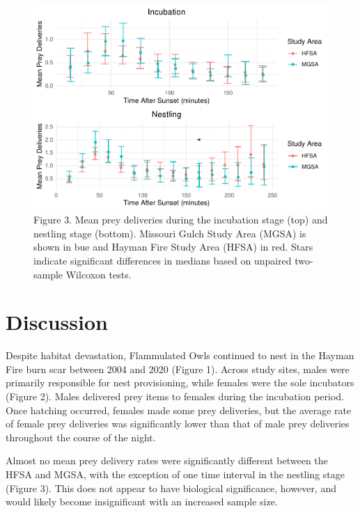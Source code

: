 \documentclass[]{article}
\begin{document}
\begin{figure}
\centering
\includegraphics{../manuscript/figures/plot_site-1.pdf}
\caption{Figure 3. Mean prey deliveries during the incubation stage
(top) and nestling stage (bottom). Missouri Gulch Study Area (MGSA) is
shown in bue and Hayman Fire Study Area (HFSA) in red. Stars indicate
significant differences in medians based on unpaired two-sample Wilcoxon
tests.}
\end{figure}

\hypertarget{discussion}{%
\section{Discussion}\label{discussion}}

Despite habitat devastation, Flammulated Owls continued to nest in the
Hayman Fire burn scar between 2004 and 2020 (Figure 1). Across study
sites, males were primarily responsible for nest provisioning, while
females were the sole incubators (Figure 2). Males delivered prey items
to females during the incubation period. Once hatching occurred, females
made some prey deliveries, but the average rate of female prey
deliveries was significantly lower than that of male prey deliveries
throughout the course of the night.

Almost no mean prey delivery rates were significantly different between
the HFSA and MGSA, with the exception of one time interval in the
nestling stage (Figure 3). This does not appear to have biological
significance, however, and would likely become insignificant with an
increased sample size.

\renewcommand\refname{References}

\end{document}
